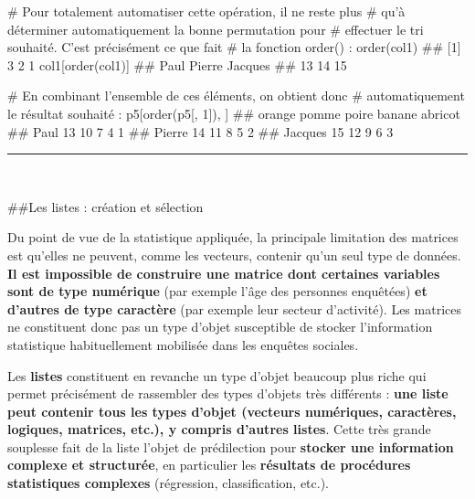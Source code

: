 \documentclass[12pt,twosided, notitlepage]{book}
\newenvironment{Shaded}{}{}
\newcommand{\CommentTok}[1]{\textcolor[rgb]{0.00,0.50,0.00}{#1}}
\newcommand{\DecValTok}[1]{#1}
\newcommand{\KeywordTok}[1]{\textcolor[rgb]{0.00,0.00,1.00}{#1}}
\newcommand{\NormalTok}[1]{#1}
\renewenvironment{Shaded}{\begin{snugshade}}{\end{snugshade}}
\begin{document}
\begin{enumerate}
\begin{Shaded}
\begin{Highlighting}[]
\CommentTok{# Pour totalement automatiser cette opération, il ne reste plus}
\CommentTok{# qu'à déterminer automatiquement la bonne permutation pour }
\CommentTok{# effectuer le tri souhaité. C'est précisément ce que fait}
\CommentTok{# la fonction order() : }
\KeywordTok{order}\NormalTok{(col1)}
\NormalTok{  ## [1] 3 2 1}
\NormalTok{col1[}\KeywordTok{order}\NormalTok{(col1)]}
\NormalTok{  ##    Paul  Pierre Jacques }
\NormalTok{  ##      13      14      15}

\CommentTok{# En combinant l'ensemble de ces éléments, on obtient donc}
\CommentTok{# automatiquement le résultat souhaité : }
\NormalTok{p5[}\KeywordTok{order}\NormalTok{(p5[, }\DecValTok{1}\NormalTok{]), ]}
\NormalTok{  ##         orange pomme poire banane abricot}
\NormalTok{  ## Paul        13    10     7      4       1}
\NormalTok{  ## Pierre      14    11     8      5       2}
\NormalTok{  ## Jacques     15    12     9      6       3}
\end{Highlighting}
\end{Shaded}

  \begin{center} \rule{0.5\linewidth}{\linethickness}\end{center} 
    \bigskip 
    \fi
\end{enumerate}

~

\#\#Les listes : création et sélection

Du point de vue de la statistique appliquée, la principale limitation
des matrices est qu'elles ne peuvent, comme les vecteurs, contenir qu'un
seul type de données. \textbf{Il est impossible de construire une
matrice dont certaines variables sont de type numérique} (par exemple
l'âge des personnes enquêtées) \textbf{et d'autres de type caractère}
(par exemple leur secteur d'activité). Les matrices ne constituent donc
pas un type d'objet susceptible de stocker l'information statistique
habituellement mobilisée dans les enquêtes sociales.

Les \textbf{listes} constituent en revanche un type d'objet beaucoup
plus riche qui permet précisément de rassembler des types d'objets très
différents : \textbf{une liste peut contenir tous les types d'objet
(vecteurs numériques, caractères, logiques, matrices, etc.), y compris
d'autres listes}. Cette très grande souplesse fait de la liste l'objet
de prédilection pour \textbf{stocker une information complexe et
structurée}, en particulier les \textbf{résultats de procédures
statistiques complexes} (régression, classification, etc.).
\end{document}
